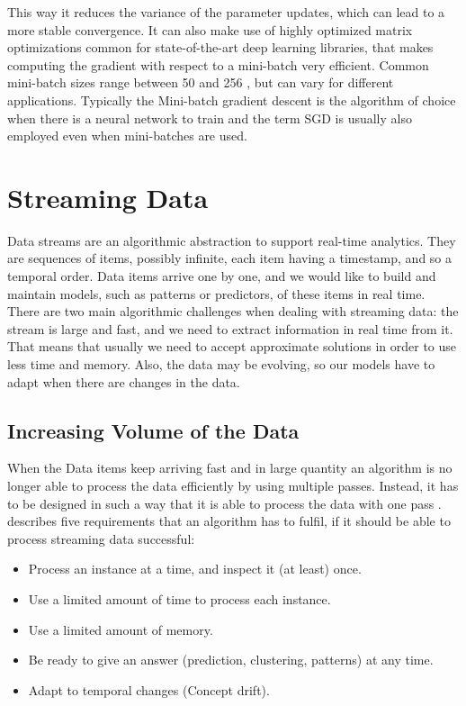 \documentclass[12pt,oneside,a4paper,parskip]{scrbook}
\begin{document}
This way it reduces the variance of the parameter updates, which can lead to a more stable convergence.
It can also make use of highly optimized matrix optimizations common for state-of-the-art deep learning libraries,
that makes computing the gradient with respect to a mini-batch very efficient. 
Common mini-batch sizes range between 50 and 256 , but can vary for different applications. Typically the Mini-batch gradient descent is the 
algorithm of choice when there is a neural network to train and the term SGD is usually also employed even when mini-batches
are used. \cite{overvieDiffRSLVQ}

\pagebreak

\section{Streaming Data}

Data streams are an algorithmic abstraction to support real-time analytics. They are sequences of items, 
possibly infinite, each item having a timestamp, and so a temporal order. Data items arrive one by one, 
and we would like to build and maintain models, such as patterns or predictors, of these items in real time. 
There are two main algorithmic challenges when dealing with streaming data: the stream is large and fast, 
and we need to extract information in real time from it. That means that usually we need to accept approximate 
solutions in order to use less time and memory.
Also, the data may be evolving, so our models have to adapt when there are changes in the data. \cite{MLonDataStreams}

\subsection{Increasing Volume of the Data}
When the Data items keep arriving fast and in large quantity an algorithm is no longer able to process the data efficiently
by using multiple passes. Instead, it has to be designed in such a way that it is able to process the data with one pass \cite{aggarwal2007data}.
\cite{MLonDataStreams} describes five requirements that an algorithm has to fulfil, if it should be able to process streaming data successful:

\begin{itemize}
  \item Process an instance at a time, and inspect it (at least) once.
  \item Use a limited amount of time to process each instance.
  \item Use a limited amount of memory.
  \item Be ready to give an answer (prediction, clustering, patterns) at any time.
  \item Adapt to temporal changes (Concept drift).
  \label{enum:5requ}
\end{itemize}
\end{document}
